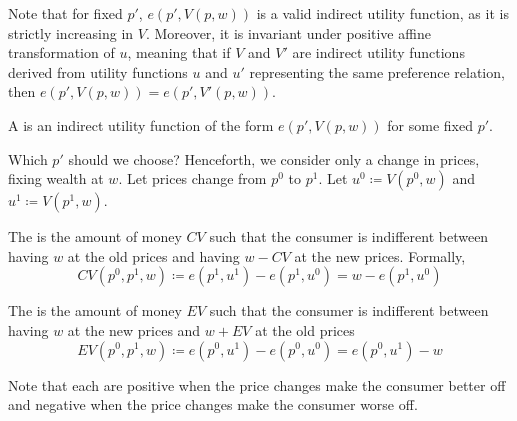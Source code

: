 \documentclass[12pt]{article}
\begin{document}
\begin{remark}
	Note that for fixed $p'$, $e(p',V(p,w))$ is a valid indirect utility function, as it is strictly increasing in $V$. Moreover, it is invariant under positive affine transformation of $u$, meaning that if $V$ and $V'$ are indirect utility functions derived from utility functions $u$ and $u'$ representing the same preference relation, then $e(p',V(p,w)) = e(p',V'(p,w))$.
\end{remark}

\begin{definition}
	A  is an indirect utility function of the form $e(p',V(p,w))$ for some fixed $p'$.
\end{definition}

\begin{remark}
	Which $p'$ should we choose? Henceforth, we consider only a change in prices, fixing wealth at $w$. Let prices change from $p^0$ to $p^1$. Let $u^0 \coloneqq V(p^0,w)$ and $u^1 \coloneqq V(p^1,w)$. 
\end{remark}

\begin{definition}
	The  is the amount of money $CV$ such that the consumer is indifferent between having $w$ at the old prices and having $w - CV$ at the new prices. Formally,
	\[
	CV(p^0,p^1,w) \coloneqq e(p^1,u^1) - e(p^1,u^0) = w - e(p^1,u^0)
	\]
\end{definition}
\begin{definition}
	The  is the amount of money $EV$ such that the consumer is indifferent between having $w$ at the new prices and $w + EV$ at the old prices
	\[
	EV(p^0,p^1,w) \coloneqq e(p^0,u^1) - e(p^0,u^0) = e(p^0,u^1) - w
	\]
\end{definition}

\begin{remark}
	Note that each are positive when the price changes make the consumer better off and negative when the price changes make the consumer worse off.
\end{remark}
\end{document}
